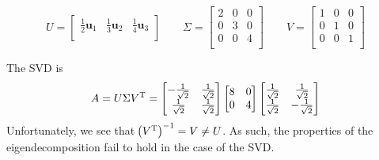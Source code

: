 \documentclass[a4paper]{article}
\begin{document}
\[
	U = 
	\begin{bmatrix}
		\frac{1}{2}\bm{u}_{1} & \frac{1}{3}\bm{u}_{2} & \frac{1}{4}\bm{u}_{3} \\
	\end{bmatrix}
	\qquad
	\Sigma = 
	\begin{bmatrix}
		2 & 0 & 0 \\
		0 & 3 & 0 \\
		0 & 0 & 4 \\
	\end{bmatrix}
	\qquad
	V = 
	\begin{bmatrix}
		1 & 0 & 0 \\
		0 & 1 & 0 \\
		0 & 0 & 1 \\
	\end{bmatrix}
\]


The SVD is
\[
	\displaystyle{A = U \Sigma V^{\textsc{T}} =
	\begin{bmatrix}
		-\frac{1}{\sqrt{2}} & \frac{1}{\sqrt{2}} \\
		\frac{1}{\sqrt{2}} & \frac{1}{\sqrt{2}} \\
	\end{bmatrix}
	\begin{bmatrix}
		8 & 0 \\
		0 & 4 \\
	\end{bmatrix}
	\begin{bmatrix}
		\frac{1}{\sqrt{2}} & \frac{1}{\sqrt{2}} \\
		\frac{1}{\sqrt{2}} & -\frac{1}{\sqrt{2}} \\
\end{bmatrix}}
\]
Unfortunately, we see that \(\!\left( V^{\textsc{T}} \right)^{-1} = V \neq U\). As such, the properties of the eigendecomposition fail to hold in the case of the SVD.
\end{document}
